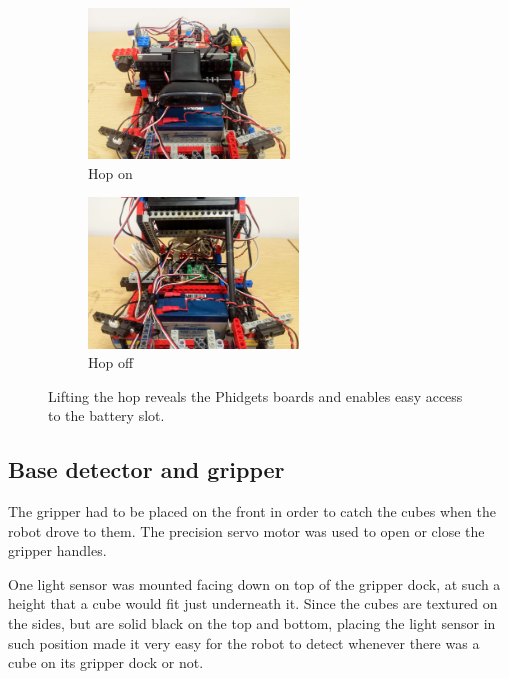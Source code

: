 \begin{figure}[ht]
    \centering
    \begin{subfigure}{0.49\textwidth}
        \includegraphics[width=\linewidth, height=4cm]{res/robot-pics/top-on.jpg}
        \caption{Hop on}
        \label{fig:hop-on}
    \end{subfigure}
    \begin{subfigure}{0.49\textwidth}
        \includegraphics[width=\linewidth, height=4cm]{res/robot-pics/top-off.jpg}
        \caption{Hop off}
        \label{fig:hop-off}
    \end{subfigure}
    \caption{Lifting the hop reveals the Phidgets boards and enables easy access to the battery slot.}
    \label{fig:hop-on-off}
\end{figure}


\subsection{Base detector and gripper}

The gripper had to be placed on the front in order to catch the cubes when the robot drove to them. The precision servo motor was used to open or close the gripper handles.

One light sensor was mounted facing down on top of the gripper dock, at such a height that a cube would fit just underneath it. Since the cubes are textured on the sides, but are solid black on the top and bottom, placing the light sensor in such position made it very easy for the robot to detect whenever there was a cube on its gripper dock or not.

